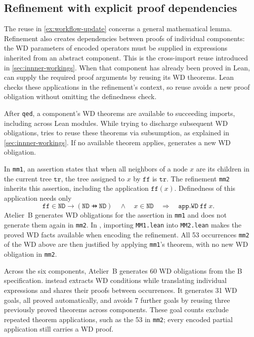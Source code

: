 \subsection{Refinement with explicit proof dependencies}
\label{sec:refinement-dependencies}

The reuse in \cref{ex:workflow-update} concerns a general mathematical lemma.
Refinement also creates dependencies between proofs of individual components: the WD parameters of encoded operators must be supplied in expressions inherited from an abstract component.
This is the cross-import reuse introduced in \cref{sec:innner-workings}.
When that component has already been proved in Lean, \barrel can supply the required proof arguments by reusing its WD theorems.
Lean checks these applications in the refinement's context, so reuse avoids a new proof obligation without omitting the definedness check.




After \texttt{qed}, a component's WD theorems are available to succeeding imports, including across Lean modules.
While trying to discharge subsequent WD obligations, \barrel tries to reuse these theorems via subsumption, as explained in \cref{sec:innner-workings}.
If no available theorem applies, \barrel generates a new WD obligation.

\begin{example}
\label{ex:workflow-refinement}
In \texttt{mm1}, an assertion states that when all neighbors of a node $x$ are its children in the current tree $\mathtt{tr}$, the tree assigned to $x$ by $\mathtt{ff}$ is $\mathtt{tr}$.
The refinement \texttt{mm2} inherits this assertion, including the application $\mathtt{ff}(x)$.
Definedness of this application needs only
\[
  \mathtt{ff} \in \mathtt{ND} \to (\mathtt{ND} \pfun \mathtt{ND})
  \quad\land\quad x \in \mathtt{ND}
  \quad\Longrightarrow\quad \mathtt{app.WD}\ \mathtt{ff}\ x.
\]
Atelier~B generates WD obligations for the assertion in \texttt{mm1} and does not generate them again in \texttt{mm2}.
In \barrel, importing \texttt{MM1.lean} into \texttt{MM2.lean} makes the proved WD facts available when encoding the refinement.
All 53 occurrences \texttt{mm2} of the WD above are then justified by applying \texttt{mm1}'s theorem, with no new WD obligation in \texttt{mm2}.

\end{example}

Across the six components, Atelier~B generates 60 WD obligations from the B specification.
\barrel instead extracts WD conditions while translating individual expressions and shares their proofs between occurrences.
It generates 31 WD goals, all proved automatically, and avoids 7 further goals by reusing three previously proved theorems across components.
These goal counts exclude repeated theorem applications, such as the 53 in \texttt{mm2}; every encoded partial application still carries a WD proof.

